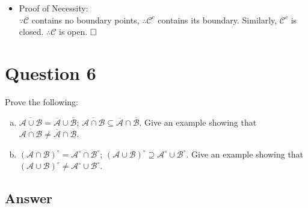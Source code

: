 \documentclass[
	12pt, %
]{fphw}
\begin{document}
\begin{itemize}
\begin{itemize}
		\item Proof of Necessity:\\
		$\because \mathcal{C}$ contains no boundary points, $\therefore \mathcal{C}^c$ contains its boundary. Similarly, $\mathcal{C}^c$ is closed. $\therefore \mathcal{C}$ is open.
		$\hfill \square$
		\end{itemize}
		
		
		
\end{itemize}


\section*{Question 6}

\begin{problem}
Prove the following:
\begin{enumerate}[a. ]
	\item $\overline{\mathcal{A}\cup \mathcal{B}}=\overline{\mathcal{A}}\cup \overline{\mathcal{B}}$; $\overline{\mathcal{A}\cap \mathcal{B}}\subseteq\overline{\mathcal{A}}\cap \overline{\mathcal{B}}$. Give an example showing that $\overline{\mathcal{A}\cap \mathcal{B}}\neq \overline{\mathcal{A}}\cap \overline{\mathcal{B}}$.
	\item $(\mathcal{A} \cap \mathcal{B})^{\circ}={\mathcal{A}}^{\circ}\cap {\mathcal{B}}^{\circ}$; $(\mathcal{A} \cup \mathcal{B})^{\circ} \supseteq {\mathcal{A}}^{\circ}\cup {\mathcal{B}}^{\circ}$. Give an example showing that $(\mathcal{A} \cup \mathcal{B})^{\circ} \neq {\mathcal{A}}^{\circ}\cup {\mathcal{B}}^{\circ}$.
\end{enumerate}
\end{problem}


\subsection*{Answer}
\end{document}
